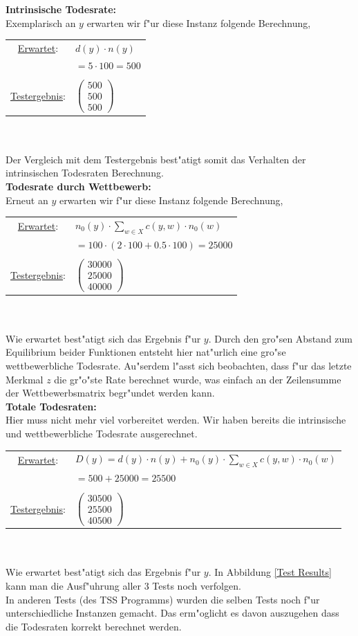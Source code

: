 \documentclass[11pt, a4paper, german]{article}
\theoremstyle{plain}
\newcommand{\trvec}[3]{\begin{pmatrix}#1\\#2\\#3\end{pmatrix}}
\begin{document}
	\textbf{Intrinsische Todesrate:}\\
	Exemplarisch an $ y $ erwarten wir f"ur diese Instanz folgende Berechnung,\\
	\renewcommand{\arraystretch}{1.2}
	\begin{tabular}{c l}
		\underline{Erwartet}: 		& $ d(y) \cdot n(y)  $\\
						& $ = 5 \cdot 100 = 500 $ \\\\
		\underline{Testergebnis}: 	& $ \trvec{500}{500}{500} $
	\end{tabular}\\\\
	Der Vergleich mit dem Testergebnis best"atigt somit das Verhalten der intrinsischen Todesraten Berechnung.\\
	
	\textbf{Todesrate durch Wettbewerb:}\\
	Erneut an $ y $ erwarten wir f"ur diese Instanz folgende Berechnung,\\
	
	\begin{tabular}{c l}
		\underline{Erwartet}: 		& $ n_0(y) \cdot \sum_{w \in X} c(y,w) \cdot n_0(w) $\\
						& $ = 100 \cdot ( 2 \cdot 100 + 0.5 \cdot 100 ) = 25000 $\\\\
		\underline{Testergebnis}: 	& $ \trvec{30000}{25000}{40000} $
	\end{tabular}\\\\
	Wie erwartet best"atigt sich das Ergebnis f"ur $ y $. Durch den gro"sen Abstand zum Equilibrium beider Funktionen entsteht hier nat"urlich eine gro"se wettbewerbliche Todesrate. Au"serdem l"asst sich beobachten, dass f"ur das letzte Merkmal $ z $ die gr"o"ste Rate berechnet wurde, was einfach an der Zeilensumme der Wettbewerbsmatrix begr"undet werden kann.\\
	
	\textbf{Totale Todesraten:}\\
	Hier muss nicht mehr viel vorbereitet werden. Wir haben bereits die intrinsische und wettbewerbliche Todesrate ausgerechnet. \\
	
	\begin{tabular}{c l}
		\underline{Erwartet}: 		& $ D(y) =  d(y) \cdot n(y) + n_0(y) \cdot \sum_{w \in X} c(y,w) \cdot n_0(w) $\\
						& $ = 500 + 25000 = 25500$\\\\
		\underline{Testergebnis}: 	& $ \trvec{30500}{25500}{40500} $
	\end{tabular}\\\\
	Wie erwartet best"atigt sich das Ergebnis f"ur $ y $. In Abbildung \ref{Test Results} kann man die Ausf"uhrung aller 3 Tests noch verfolgen.\\
	In anderen Tests (des TSS Programms) wurden die selben Tests noch f"ur unterschiedliche Instanzen gemacht. Das erm"oglicht es davon auszugehen dass die Todesraten korrekt berechnet werden.\\
	
\end{document}
